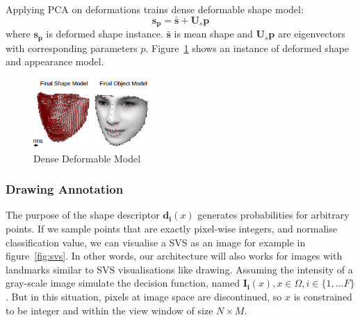 Applying PCA on deformations trains dense deformable shape model:
\begin{equation*}
    \bm{s_p}=\bm{\bar{s}} + \bm{U}_s\bm{p}
\end{equation*}
where $\bm{s_p}$ is deformed shape instance. $\bm{\bar{s}}$ is mean shape and $\bm{U}_s\bm{p}$ are eigenvectors with corresponding parameters $p$. Figure~\ref{fig:models} shows an instance of deformed shape and appearance model.
\begin{figure}[h!]
    \centering
        \includegraphics[width=0.4\textwidth]{resources/models}
    \caption{Dense Deformable Model}
    \label{fig:models}
\end{figure}

\subsubsection{Drawing Annotation}

The purpose of the shape descriptor $\bm{d_i}(x)$ generates probabilities for arbitrary points. If we sample points that are exactly pixel-wise integers, and normalise classification value, we can visualise a SVS as an image for example in figure~\ref{fig:svs}. In other words, our architecture will also works for images with landmarks similar to SVS visualisations like drawing. Assuming the intensity of a gray-scale image simulate the decision function, named $\bm{I_i}(x), x \in \Omega, i \in \{1,...F\}$. But in this situation, pixels at image space are discontinued, so $x$ is constrained to be integer and within the view window of size $N\times M$.



\clearpage